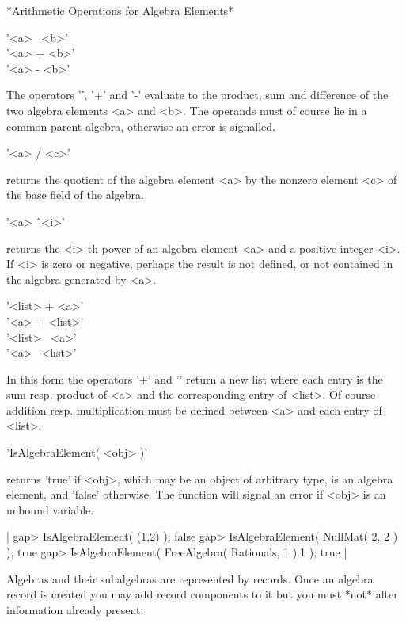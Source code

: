 \vspace{5mm}

*Arithmetic Operations for Algebra Elements*

'<a> \*\ <b>' \\
'<a> + <b>' \\
'<a> - <b>'

The operators '\*', '+' and '-' evaluate to the product, sum and difference
of the two algebra elements <a> and <b>.  The operands must of course
lie in a common parent algebra, otherwise an error is signalled.
 
\vspace{5mm}
'<a> / <c>'

returns the quotient of the algebra element <a> by the nonzero element <c>
of the base field of the algebra.

\vspace{5mm}
'<a> \^\ <i>'

returns the <i>-th power of an algebra element <a> and a positive integer
<i>.  If <i> is zero or negative, perhaps the result is not defined, or
not contained in the algebra generated by <a>.

\vspace{5mm}
'<list> + <a>' \\
'<a> + <list>' \\
'<list> \*\ <a>' \\
'<a> \*\ <list>'

In this form the operators '+' and '\*' return a new list where each entry
is the sum resp. product of <a>  and the   corresponding  entry  of <list>.
Of   course addition resp. multiplication must be defined between <a> and
each entry of <list>.


'IsAlgebraElement( <obj> )'

returns  'true' if  <obj>,  which may  be  an object of
arbitrary type, is an algebra element, and  'false' otherwise. The function
will signal an error if <obj> is an unbound variable.

|    gap> IsAlgebraElement( (1,2) );
    false
    gap> IsAlgebraElement( NullMat( 2, 2 ) );
    true
    gap> IsAlgebraElement( FreeAlgebra( Rationals, 1 ).1 );
    true |


Algebras and their subalgebras are represented by records.
Once an algebra record is created you may add record components to it but
you must *not* alter information already present.

